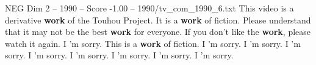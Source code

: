 \begin{textsample}{NEG Dim 2 – 1990 – Score -1.00 – 1990/tv\_com\_1990\_6.txt}  \label{ex:f2_neg_065}
This video is a derivative \textbf{work} of the Touhou Project.
It is a \textbf{work} of fiction.
Please understand that it may not be the best \textbf{work} for everyone.
If you don't like the \textbf{work}, please watch it again.
I 'm sorry.
This is a \textbf{work} of fiction.
I 'm sorry.
I 'm sorry.
I 'm sorry.
I 'm sorry.
I 'm sorry.
I 'm sorry.
I 'm sorry.
I 'm sorry.

\end{textsample}
